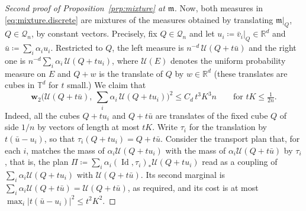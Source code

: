 \documentclass[11pt,reqno]{amsart}
\theoremstyle{plain}
\theoremstyle{definition}
\newcommand{\dw}{\mathbf{w}_2}
\newcommand{\T}{\mathbb{T}}
\newcommand{\R}{\mathbb{R}}
\newcommand{\Leb}{\mathfrak{m}}
\DeclareMathOperator{\Id}{Id}
\begin{document}
\begin{proof}[Second proof of Proposition~\ref{prp:mixture} at \( \Leb \)]
    Now, both measures in \eqref{eq:mixture.discrete} are mixtures of the measures obtained by translating \( \Leb|_Q \), \( Q\in\mathcal Q_n \), by constant vectors.
    Precisely, fix \( Q\in\mathcal Q_n \) and let \( u_i\coloneqq \bar v_i|_Q\in\R^d \) and \( \bar u\coloneqq \sum_i\alpha_iu_i \).
    Restricted to \( Q \), the left measure is \( n^{-d}\,\mathcal U(Q+t\bar u) \) and the right one is \( n^{-d}\sum_i\alpha_i\,\mathcal U(Q+tu_i) \), where \( \mathcal U(E) \) denotes the uniform probability measure on \( E \) and \( Q+w \) is the translate of \( Q \) by
    \( w\in\R^d \) (these translates are cubes in \( \T^d \) for \( t \) small.)
    We claim that
    \begin{equation}\label{eq:one.cube}
        \dw\Big(\mathcal U(Q+t\bar u),\ \sum_i\alpha_i\,\mathcal U(Q+tu_i)\Big)^2
        \le C_d\,t^3K^3n\qquad\text{for } tK\le\tfrac{1}{2n}.
    \end{equation}
    Indeed, all the cubes \( Q+tu_i \) and \( Q+t\bar u \) are translates of the fixed cube \( Q \) of side \( 1/n \) by vectors of length at most \( tK \).
    Write \( \tau_i \) for the translation by \( t(\bar u-u_i) \), so that \( \tau_i(Q+tu_i)=Q+t\bar u \).
    Consider the transport plan that, for each \( i \), matches the mass of \( \alpha_i\mathcal U(Q+tu_i) \) with the mass of \( \alpha_i\mathcal U(Q+t\bar u) \) by \( \tau_i \), that is, the plan \( \Pi\coloneqq \sum_i\alpha_i(\Id,\tau_i)_\ast \mathcal U(Q+tu_i) \) read as a coupling of \( \sum_i\alpha_i\mathcal U(Q+tu_i) \) with \( \mathcal U(Q+t\bar u) \).
    Its second marginal is \( \sum_i\alpha_i\mathcal U(Q+t\bar u)=\mathcal U(Q+t\bar u) \), as required, and its cost is at most \( \max_i\lvert t(\bar u-u_i) \rvert^2\le t^2K^2 \).


\end{proof}
\end{document}
